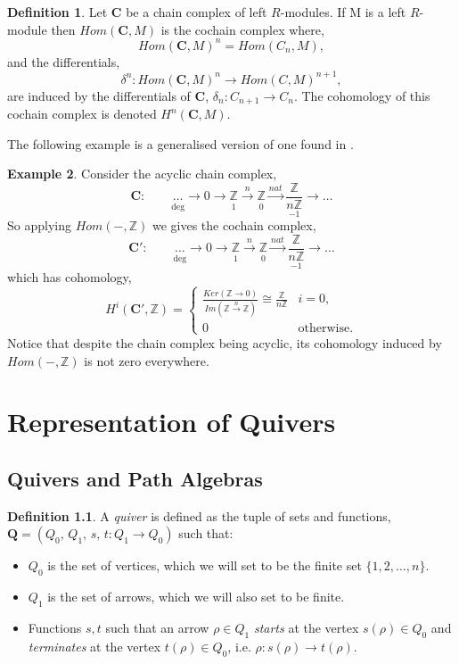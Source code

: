 \documentclass[11.5pt, twoside, a4paper, titlepage]{report}
\providecommand{\equ}[0]{\begin{equation*}}
\providecommand{\eequ}[0] {\end{equation*}}
\providecommand{\bb}[1]{\mathbb{#1}}
\theoremstyle{definition}
\newtheorem{mydef}{Definition}[section]
\newtheorem{eg}[mydef]{Example}
\theoremstyle{plain}
\begin{document}
\begin{mydef}
Let $\mathbf{C}$ be a chain complex of left $R$-modules. If M is a left $R$-module then \emph{$Hom(\mathbf{C}, M)$} is the cochain complex where,
\equ
Hom(\mathbf{C}, M)^n=Hom(C_n, M),
\eequ
and the differentials, 
\equ
\delta^n: Hom(\mathbf{C}, M)^n \to Hom(C, M)^{n+1},
\eequ
are induced by the differentials of $\mathbf{C}$, $\delta_n:C_{n+1}\to C_n$. The cohomology of this cochain complex is denoted $H^n(\mathbf{C}, M)$.
\end{mydef}

The following example is a generalised version of one found in \cite{CB1}.

\begin{eg}
Consider the acyclic chain complex, 
\equ
\mathbf{C}: \qquad \underset{\text{deg}}{\underset{}{\dots}} \xrightarrow{}0 \xrightarrow{} \underset{1}{\underset{}{\bb{Z}}} \xrightarrow{n} \underset{0}{\underset{}{\bb{Z}}} \xrightarrow{nat} \underset{-1}{\frac{\bb{Z}}{n\bb{Z}}} \xrightarrow{} \dots
\eequ
So applying $Hom(-, \bb{Z})$ we gives the cochain complex, 
\equ
\mathbf{C'}: \qquad \underset{\text{deg}}{\underset{}{\dots}} \xrightarrow{}0 \xrightarrow{} \underset{1}{\underset{}{\bb{Z}}} \xrightarrow{n} \underset{0}{\underset{}{\bb{Z}}} \xrightarrow{nat} \underset{-1}{\frac{\bb{Z}}{n\bb{Z}}} \xrightarrow{} \dots
\eequ
which has cohomology,
\equ
H^i(\mathbf{C'}, \bb{Z})=
\begin{cases}
\frac{Ker(\bb{Z}\to0)}{Im(\bb{Z}\xrightarrow{n}\bb{Z})} \cong \frac{\bb{Z}}{n\bb{Z}} & i=0, \\
0 & \text{otherwise.}
\end{cases}
\eequ
Notice that despite the chain complex being acyclic, its cohomology induced by $Hom(-, \bb{Z})$  is not zero everywhere.
\end{eg}


\chapter{Representation of Quivers}

\section{Quivers and Path Algebras}

\begin{mydef}
A \emph{quiver} is defined as the tuple of sets and functions, $\mathbf{Q}=(Q_0\text{, }Q_1\text{, }s\text{, }t: Q_1 \to Q_0)$ such that:
\begin{itemize}
\item $Q_0$ is the set of vertices, which we will set to be the finite set $\{1, 2, \dots, n\}$.
\item $Q_1$ is the set of arrows, which we will also set to be finite.
\item Functions $s, t$ such that an arrow $\rho \in Q_1$ \emph{starts} at the vertex $s(\rho)\in Q_0$ and \emph{terminates} at the vertex $t(\rho)\in Q_0$, i.e. $\rho: s(\rho) \to t(\rho)$.
\end{itemize}
\end{mydef}
\end{document}
